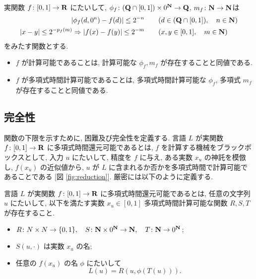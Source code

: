  \begin{lemma}
  実関数 $f\colon [0,1] \to \mathbf R$ にたいして,
  $\phi_f\colon (\mathbf Q \cap [0, 1]) \times 0^\mathbf N \to \mathbf Q$, $m_f\colon \mathbf N \to \mathbf N$は
  \begin{align}
   |\phi_f(d, 0^n) - f(d)| \le 2^{-n} 
   &\qquad (d \in (\mathbf Q \cap [0,1]), \quad n \in \mathbf N)\\
   |x-y| \le 2^{-p_f(m)} \Rightarrow |f(x) - f(y)| \le 2^{-m}
   &\qquad (x, y \in [0, 1], \quad m \in \mathbf N)
  \end{align}
 をみたす関数とする.
  \begin{itemize}
   \item $f$ が計算可能であることは, 計算可能な $\phi_f, m_f$ が存在することと同値である. 
   \item $f$ が多項式時間計算可能であることは, 多項式時間計算可能な 
  $\phi_f$, 多項式 $m_f$ が存在することと同値である.
  \end{itemize}
\end{lemma}

\subsection{完全性}

 関数の下限を示すために, 困難及び完全性を定義する.
 言語 $L$ が実関数 $f\colon [0,1] \to \mathbf R$ に多項式時間還元可能であるとは,
 $f$ を計算する機械をブラックボックスとして, 入力 $u$ にたいして,
 精度を $f$ に与え, ある実数 $x_u$ の神託を模倣し, $f(x_u)$ の近似値から,
 $u$ が $L$ に含まれるか否かを多項式時間で計算可能であることである
 [図 \ref{fig:reduction}].
 厳密には以下のように定義する.

 \begin{definition}[多項式時間還元可能]
  言語 $L$ が実関数 $f\colon [0,1] \to \mathbf R$ に多項式時間還元可能であるとは, 
  任意の文字列 $u$ にたいして, 以下を満たす実数 $x_u \in [0,1]$
  多項式時間計算可能な関数 $R,S,T$ が存在すること.
  \begin{itemize}
   \item $R\colon N \times N \to \{0,1\}, \quad S\colon \mathbf N\times 0^\mathbf N \to \mathbf N, \quad
  T\colon \mathbf N \to 0^\mathbf N$;
   \item $S(u, \cdot)$ は実数 $x_u$ の名;
   \item 任意の $f(x_u)$ の名 $\phi$ にたいして
	 \[
	  L(u) = R(u, \phi(T(u))).
	 \]
  \end{itemize}
 \end{definition}

